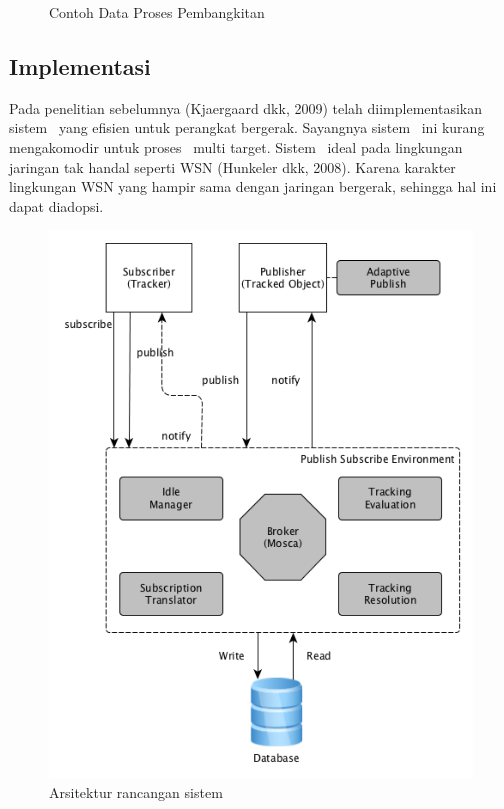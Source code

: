 \noindent
\begin{figure}
	\centering
	\lstset{basicstyle=\ttfamily,frame=single,language=javascript}
	
	\caption{Contoh Data Proses Pembangkitan}
\label{fig:pembangkitan_data}
\end{figure}


\subsection{Implementasi}

Pada penelitian sebelumnya (Kjaergaard dkk, 2009) telah diimplementasikan sistem
\tracking~yang efisien untuk perangkat bergerak. Sayangnya sistem \tracking~ini
kurang mengakomodir untuk proses \tracking~multi target. Sistem \pubsub~ideal
pada lingkungan jaringan tak handal seperti WSN (Hunkeler dkk, 2008). Karena
karakter lingkungan WSN yang hampir sama dengan jaringan bergerak, sehingga hal
ini dapat diadopsi.

\noindent
\begin{figure}
  \centering
  \includegraphics[scale=0.60]
  {images/3-sistem}
  \caption{Arsitektur rancangan sistem}
\label{fig:sistem}
\end{figure}

